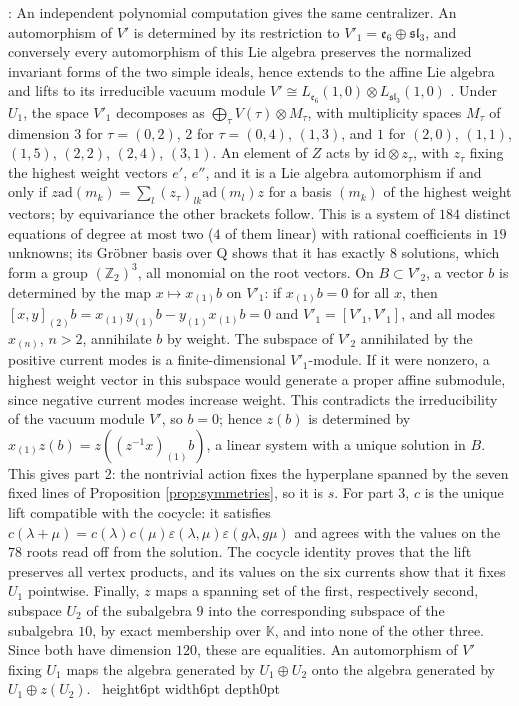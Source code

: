 \documentclass[leqno]{article}
\newcommand{\K}{\ensuremath{\mathbb{K}}}
\newcommand{\Q}{\mathrm{Q}}
\newcommand{\Z}{\ensuremath{\mathbb{Z}}}
\newcommand{\qed}{\hfill \vrule height6pt  width6pt depth0pt}
\newcommand{\ot}{\otimes}
\newcommand{\epsi}{\varepsilon}
\newenvironment{proof}[1][]{\noindent {\it Proof #1} : }{\hbox{~}\qed
\smallskip
}
\numberwithin{equation}{section}
\begin{document}
\begin{proof}
An independent polynomial computation gives the same centralizer. An automorphism of $V'$ is determined by its restriction to $V'_1 = \mathfrak e_6 \oplus \mathfrak{sl}_3$, and conversely every automorphism of this Lie algebra preserves the normalized invariant forms of the two simple ideals, hence extends to the affine Lie algebra and lifts to its irreducible vacuum module $V' \cong L_{\mathfrak e_6}(1,0) \ot L_{\mathfrak{sl}_3}(1,0)$ \cite{Kac90}. Under $U_1$, the space $V'_1$ decomposes as $\bigoplus_\tau V(\tau) \ot M_\tau$, with multiplicity spaces $M_\tau$ of dimension $3$ for $\tau = (0,2)$, $2$ for $\tau = (0,4)$, $(1,3)$, and $1$ for $(2,0)$, $(1,1)$, $(1,5)$, $(2,2)$, $(2,4)$, $(3,1)$. An element of $Z$ acts by $\mathrm{id} \ot z_\tau$, with $z_\tau$ fixing the highest weight vectors $e'$, $e''$, and it is a Lie algebra automorphism if and only if $z \mathrm{ad}(m_k) = \sum_l (z_\tau)_{lk} \mathrm{ad}(m_l) z$ for a basis $(m_k)$ of the highest weight vectors; by equivariance the other brackets follow. This is a system of $184$ distinct equations of degree at most two ($4$ of them linear) with rational coefficients in $19$ unknowns; its Gröbner basis over $\Q$ shows that it has exactly $8$ solutions, which form a group $(\Z_2)^3$, all monomial on the root vectors. On $B \subset V'_2$, a vector $b$ is determined by the map $x \mapsto x_{(1)}b$ on $V'_1$: if $x_{(1)}b = 0$ for all $x$, then $[x,y]_{(2)}b = x_{(1)}y_{(1)}b - y_{(1)}x_{(1)}b = 0$ and $V'_1 = [V'_1,V'_1]$, and all modes $x_{(n)}$, $n > 2$, annihilate $b$ by weight. The subspace of $V'_2$ annihilated by the positive current modes is a finite-dimensional $V'_1$-module. If it were nonzero, a highest weight vector in this subspace would generate a proper affine submodule, since negative current modes increase weight. This contradicts the irreducibility of the vacuum module $V'$, so $b = 0$; hence $z(b)$ is determined by $x_{(1)}z(b) = z((z^{-1}x)_{(1)}b)$, a linear system with a unique solution in $B$. This gives part 2: the nontrivial action fixes the hyperplane spanned by the seven fixed lines of Proposition \ref{prop:symmetries}, so it is $s$. For part 3, $c$ is the unique lift compatible with the cocycle: it satisfies $c(\lambda+\mu) = c(\lambda)c(\mu)\epsi(\lambda,\mu)\epsi(g\lambda,g\mu)$ and agrees with the values on the $78$ roots read off from the solution. The cocycle identity proves that the lift preserves all vertex products, and its values on the six currents show that it fixes $U_1$ pointwise. Finally, $z$ maps a spanning set of the first, respectively second, subspace $U_2$ of the subalgebra $9$ into the corresponding subspace of the subalgebra $10$, by exact membership over $\K$, and into none of the other three. Since both have dimension $120$, these are equalities. An automorphism of $V'$ fixing $U_1$ maps the algebra generated by $U_1 \oplus U_2$ onto the algebra generated by $U_1 \oplus z(U_2)$.
\end{proof}
\end{document}
